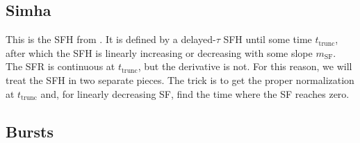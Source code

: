 \documentclass[12pt, letterpaper, preprint]{aastex}
\newcommand{\sftrunc}{t_{\mathrm{trunc}}}
\begin{document}
\subsection{Simha}
This is the SFH from \citet{simha14}.  It is defined by a delayed-$\tau$ SFH until some time $\sftrunc$, after which the SFH is linearly increasing or decreasing with some slope $m_{\mathrm{SF}}$.  The SFR is continuous at $\sftrunc$, but the derivative is not.  For this reason, we will treat the SFH in two separate pieces.  The trick is to get the proper normalization at $\sftrunc$ and, for linearly decreasing SF, find the time where the SF reaches zero. 


\subsection{Bursts}
\end{document}
